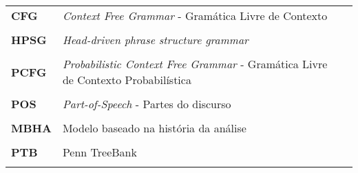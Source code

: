 
\begin{longtable}{llp{12cm}}
{\bf CFG}     &   \emph{Context Free Grammar} - Gramática Livre de Contexto  \\ \\
{\bf HPSG}    &   \emph{Head-driven phrase structure grammar}\\ \\
{\bf PCFG}    &   \emph{Probabilistic Context Free Grammar} - Gramática Livre de Contexto Probabilística\\ \\
{\bf POS}     &   \emph{Part-of-Speech} - Partes do discurso\\ \\
{\bf MBHA}    &   Modelo baseado na história da análise\\ \\
{\bf PTB}    &   Penn TreeBank\\ \\
\end{longtable}
